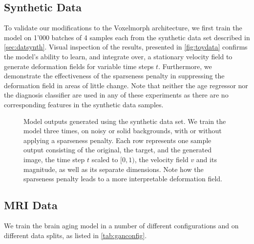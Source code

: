 \subsection{Synthetic Data}
To validate our modifications to the Voxelmorph architecture, we first train the model on 1'000 batches of 4 samples each from the synthetic data set described in \autoref{sec:datsynth}. Visual inspection of the results, presented in \autoref{fig:toydata} confirms the model's ability to learn, and integrate over, a stationary velocity field to generate deformation fields for variable time steps $t$. Furthermore, we demonstrate the effectiveness of the sparseness penalty in suppressing the deformation field in areas of little change. Note that neither the age regressor nor the diagnosis classifier are used in any of these experiments as there are no corresponding features in the synthetic data samples.

\begin{figure}
	\centering
	
	\vspace*{-15pt}
	\caption{Model outputs generated using the synthetic data set. We train the model three times, on noisy or solid backgrounds, with or without applying a sparseness penalty. Each row represents one sample output consisting of the original, the target, and the generated image, the time step $t$ scaled to $[0, 1)$, the velocity field $v$ and its magnitude, as well as its separate dimensions. Note how the sparseness penalty leads to a more interpretable deformation field.}
	\label{fig:toydata}
\end{figure}

\subsection{MRI Data}

We train the brain aging model in a number of different configurations and on different data splits, as listed in \autoref{tab:ganconfig}.

